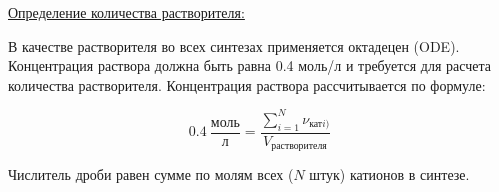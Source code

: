 \underline{Определение количества растворителя:}

В качестве растворителя во всех синтезах применяется октадецен (ODE). Концентрация раствора должна быть равна 0.4 моль/л и требуется для расчета количества растворителя. Концентрация раствора рассчитывается по формуле:

$$0.4 \: \frac{\text{моль}}{\text{л}}= \frac{\sum_{i=1}^N \nu_{\text{кат}i)}}{V_\text{растворителя}}$$

Числитель дроби равен сумме по молям всех ($N$ штук) катионов в синтезе.
